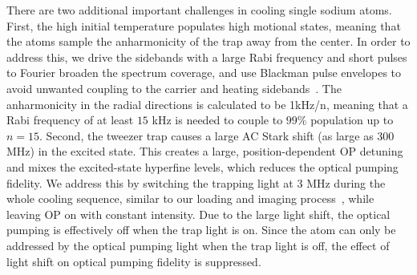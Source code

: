 \documentclass[aps,prl,twocolumn,groupedaddress]{revtex4-1}
\begin{document}
There are two additional important challenges in cooling single sodium atoms.
First, the high initial temperature populates high motional states,
meaning that the atoms sample the anharmonicity of the trap away from the center.
In order to address this, we drive the sidebands with a large Rabi frequency
and short pulses to Fourier broaden the spectrum coverage, and use Blackman pulse envelopes
to avoid unwanted coupling to the carrier and heating sidebands~\cite{Kasevich1992}.
The anharmonicity in the radial directions is calculated to be 1kHz/n, meaning that a
Rabi frequency of at least $15$ kHz is needed to couple to $99$\% population up to $n=15$.
Second, the tweezer trap causes a large AC Stark shift (as large as $300$ MHz)
in the excited state. This creates a large, position-dependent OP detuning
and mixes the excited-state hyperfine levels, which reduces the optical pumping fidelity.
We address this by switching the trapping light at 3 MHz during the whole cooling sequence,
similar to our loading and imaging process~\cite{Hutzler2017-LightShifts},
while leaving OP on with constant intensity.
Due to the large light shift, the optical pumping is effectively off when the trap light is on.
Since the atom can only be addressed by the optical pumping light when the trap light is off,
the effect of light shift on optical pumping fidelity is suppressed.
\end{document}
